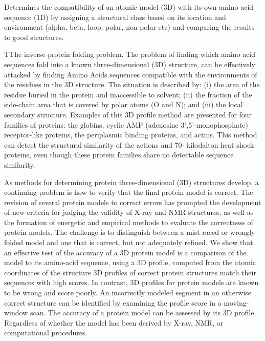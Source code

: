 \documentclass[11pt, letterpaper, portuguese]{article}
\begin{document}
    \par{Determines the compatibility of an atomic model (3D) with its own amino acid sequence (1D) by assigning a structural class based on its location and environment (alpha, beta, loop, polar, non-polar etc) and comparing the results to good structures.}
    
    \par{TThe inverse protein folding problem. The problem of finding which amino acid sequences fold into a known three-dimensional (3D) structure, can be effectively attacked by finding Amino Acids sequences compatible with the environments of the residues in the 3D structure. The situation is described by: 
(i) the area of the residue buried in the protein and inaccessible to solvent; 
(ii) the fraction of the side-chain area that is covered by polar atoms (O and N); and 
(iii) the local secondary structure. 
Examples of this 3D profile method are presented for four families of proteins: the globins, cyclic AMP (adenosine 3',5'-monophosphate) receptor-like proteins, the periplasmic binding proteins, and actins. This method can detect the structural similarity of the actions and 70- kilodalton heat shock proteins, even though these protein families share no detectable sequence similarity.}

    \par{As methods for determining protein three-dimensional (3D) structures develop, a continuing problem is how to verify that the final protein model is correct. The revision of several protein models to correct errors has prompted the development of new criteria for judging the validity of X-ray and NMR structures, as well as the formation of energetic and empirical methods to evaluate the correctness of protein models. The challenge is to distinguish between a mist-raced or wrongly folded model and one that is correct, but not adequately refined. We show that an effective test of the accuracy of a 3D protein model is a comparison of the model to its amino-acid sequence, using a 3D profile, computed from the atomic coordinates of the structure 3D profiles of correct protein structures match their sequences with high scores. In contrast, 3D profiles for protein models are known to be wrong and score poorly. An incorrectly modeled segment in an otherwise correct structure can be identified by examining the profile score in a moving-window scan. The accuracy of a protein model can be assessed by its 3D profile. Regardless of whether the model has been derived by X-ray, NMR, or computational procedures.}
\end{document}
